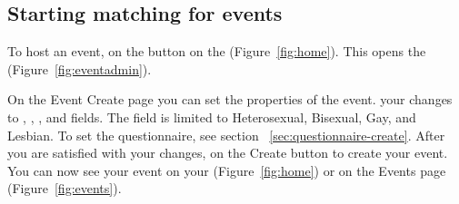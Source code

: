 \subsection{Starting matching for events}
\label{sec:events-starting}
To host an event,  on the  button on the  (Figure~\ref{fig:home}). This opens the  (Figure~\ref{fig:eventadmin}). 

On the Event Create page you can set the properties of the event.   your changes to , , , and  fields.  The  field is limited to Heterosexual, Bisexual, Gay, and Lesbian.  To set the questionnaire, see section ~\ref{sec:questionnaire-create}.  After you are satisfied with your changes,  on the Create button to create your event.   You can now see your event on your  (Figure~\ref{fig:home}) or on the Events page (Figure~\ref{fig:events}).
